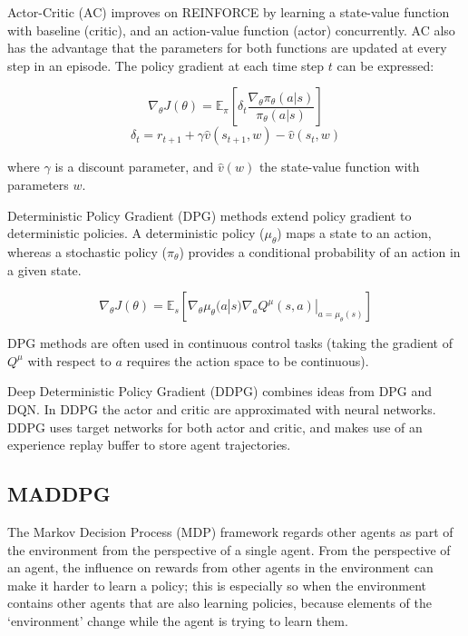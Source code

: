 \documentclass[11pt,a4paper]{article}
\begin{document}
Actor-Critic (AC) improves on REINFORCE by learning a state-value function with baseline (critic), and an action-value function (actor) concurrently.
AC also has the advantage that the parameters for both functions are updated at every step in an episode.
The policy gradient at each time step $t$ can be expressed:

\begin{equation}
  \nabla_\theta J(\theta)=\mathbb{E}_\pi\left[\delta_t \frac{\nabla_\theta\pi_\theta(a|s)}{\pi_\theta(a|s)}\right]
\end{equation}
\begin{equation}
  \delta_t = r_{t+1}+\gamma \hat{v}(s_{t+1}, w)-\hat{v}(s_t,w)
\end{equation}

where $\gamma$ is a discount parameter, and $\hat{v}(w)$ the state-value function with parameters $w$.

Deterministic Policy Gradient (DPG) methods extend policy gradient to deterministic policies.
A deterministic policy ($\mu_\theta$) maps a state to an action,
whereas a stochastic policy ($\pi_\theta$) provides a conditional probability of an action in a given state.

\begin{equation}
  \nabla_\theta J(\theta)=\mathbb{E}_s\left[\nabla_\theta \mu_\theta(a|s) \nabla_a Q^\mu(s,a)|_{a=\mu_\theta(s)}\right]
\end{equation}

DPG methods are often used in continuous control tasks
(taking the gradient of $Q^\mu$ with respect to $a$ requires the action space to be continuous).

Deep Deterministic Policy Gradient (DDPG) combines ideas from DPG and DQN.
In DDPG the actor and critic are approximated with neural networks.
DDPG uses target networks for both actor and critic, and makes use of an experience replay buffer to store agent trajectories.

\subsection{MADDPG}

The Markov Decision Process (MDP) framework regards other agents as part of the environment from the perspective of a single agent.
From the perspective of an agent, the influence on rewards from other agents in the environment can make it harder to learn a policy;
this is especially so when the environment contains other agents that are also learning policies,
because elements of the `environment' change while the agent is trying to learn them.
\end{document}

